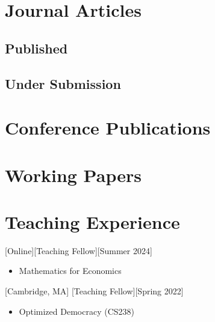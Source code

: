 \documentclass{article}
\begin{document}
	\section{Journal Articles}
	\subsection{Published}
	
    \begin{etaremune}
    [itemsep=-.5ex,
    	leftmargin=3.5ex]
        
    \end{etaremune}
    
    \subsection{Under Submission}
    \begin{etaremune}
    [itemsep=-.5ex,
    	leftmargin=3.5ex]
        
    \end{etaremune}
    


    \section{Conference Publications}
    \begin{etaremune}
    	[itemsep=-.5ex,
    	leftmargin=3.5ex]
        
    \end{etaremune}
    
    \section{Working Papers}
    \begin{etaremune}
    	[itemsep=-.5ex,
    	leftmargin=3.5ex]
        
    \end{etaremune}
    

    
    \section{Teaching Experience}
    [Online][Teaching Fellow][Summer 2024]
    \begin{itemize}
    	\item Mathematics for Economics
    \end{itemize}
    [Cambridge, MA]
    [Teaching Fellow][Spring 2022]
    \begin{itemize}
        \item Optimized Democracy (CS238)
    \end{itemize}
    
\end{document}
